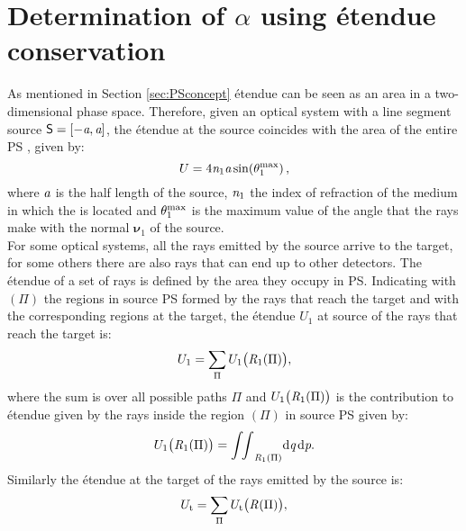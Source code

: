 \section{Determination of $\alpha$ using \'{e}tendue conservation} \label{sec:Tir_alpha}
As mentioned in Section \ref{sec:PSconcept} \'{e}tendue can be seen as an area in a two-dimensional phase space. 
Therefore, given an optical system with a line segment source $\textsf{S} = [-\textit{a}, \textit{a}]$, the \'{e}tendue at the source coincides with the area of the entire PS , given by:
\begin{equation}\label{eq:etenduesource}
U = 4\textit{n}_1 \textit{a} \sin(\theta_1^{\textrm{max}})\,,
\end{equation}
 where $\textit{a}$ is the half length of the source, $\textit{n}_1$ the index of refraction of the medium in which the  is located and $\theta_1^{\textrm{max}}$ is the maximum value of the angle that the rays make with the normal $\boldsymbol{\nu}_1$ of the source.\\ \indent 
For some optical systems, all the rays emitted by the source arrive to the target, for some others there are also rays that can end up to other detectors. 
The \'{e}tendue of a set of rays is defined by the area they occupy in PS. Indicating with $(\Pi)$ the regions in source PS formed by the rays that reach the target and with  the corresponding regions at the target, the \'{e}tendue $U_1$ at source of the rays that reach the target is:
\begin{equation}\label{eq:etenduesumsource}
U_1 = \sum_\Pi{U_1\big(\mbox{$\emph{R}_{\textit{$1$}}$}(\Pi)\big)},
\end{equation}
where the sum is over all possible paths $\Pi$ and $U_1\big(\mbox{$\emph{R}_{\textit{$1$}}$}(\Pi)\big)$ is the contribution to \'{e}tendue given by the rays inside the region 
$(\Pi)$ in source PS given by:
\begin{equation}\label{eq:etendueintegralsource}
U_1\big(\mbox{$\emph{R}_{\textit{$1$}}$}(\Pi)\big) = {\int\!\!\int}_{\emph{R}_1(\Pi)} \textrm{d}\textit{q}\,\textrm{d}\textit{p}.
\end{equation}
Similarly the \'{e}tendue at the target of the rays emitted by the source is:
\begin{equation}
U_\textrm{t}= \sum_\Pi{U_\textrm{t}\big(\mbox{$\emph{R}_{\textit{}}$}(\Pi)\big)},
\end{equation}
